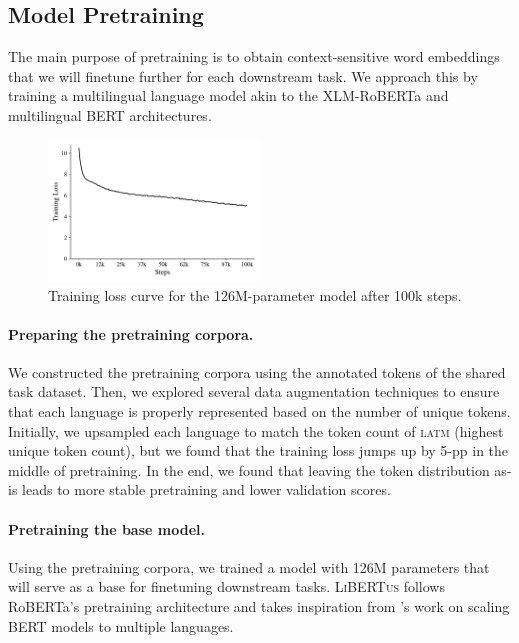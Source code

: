 \documentclass[11pt]{article}
\newcommand{\libertus}{\textsc{LiBERTus}}
\begin{document}

\subsection{Model Pretraining}

The main purpose of pretraining is to obtain context-sensitive word embeddings that we will finetune further for each downstream task.
We approach this by training a multilingual language model akin to the XLM-RoBERTa \cite{conneau-etal-2020-unsupervised} and multilingual BERT \cite{devlin-etal-2019-bert} architectures.

\begin{figure}[t]
\centering
\includegraphics[width=0.5\textwidth]{figures/train_loss.pdf}
\caption{Training loss curve for the 126M-parameter model after 100k steps.}
\label{fig:training_curve}
\end{figure}

\paragraph{Preparing the pretraining corpora.} We constructed the pretraining corpora using the annotated tokens of the shared task dataset.
Then, we explored several data augmentation techniques to ensure that each language is properly represented based on the number of unique tokens.
Initially, we upsampled each language to match the token count of \textsc{latm} (highest unique token count), but we found that the training loss jumps up by 5-pp in the middle of pretraining.
In the end, we found that leaving the token distribution as-is leads to more stable pretraining and lower validation scores.

\paragraph{Pretraining the base model.} Using the pretraining corpora, we trained a model with 126M parameters that will serve as a base for finetuning downstream tasks.
\libertus{} follows RoBERTa's pretraining architecture \cite{liu-etal-2019-roberta} and takes inspiration from \citet{conneau-etal-2020-unsupervised}'s work on scaling BERT models to multiple languages.
\end{document}
